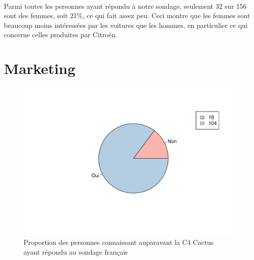 \documentclass[12pt]{article}\usepackage[]{graphicx}\usepackage[]{color}
\makeatletter
\def\maxwidth{ %
  \ifdim\Gin@nat@width>\linewidth
    \linewidth
  \else
    \Gin@nat@width
  \fi
}
\newenvironment{knitrout}{}{} %
\makeatother
\begin{document}
\paragraph{} Parmi toutes les personnes ayant répondu à notre sondage,
seulement 32 sur 156 sont des femmes, soit 21\%, ce qui fait assez peu. Ceci
montre que les femmes sont beaucoup moins intéressées par les voitures que les
hommes, en particulier ce qui concerne celles produites par Citroën.

\break
\section{Marketing}

\begin{knitrout}
\color{fgcolor}\begin{figure}[H]
\includegraphics[width=\maxwidth]{figure/know_fr-1} \caption[Proportion des personnes connaissant auparavant la C4 Cactus ayant répondu au sondage français]{Proportion des personnes connaissant auparavant la C4 Cactus ayant répondu au sondage français}\label{fig:know fr}
\end{figure}


\end{knitrout}
\end{document}

